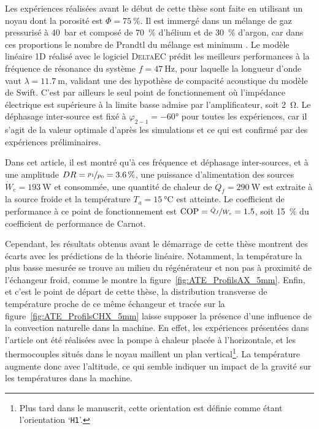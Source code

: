 Les expériences réalisées avant le début de cette thèse sont faite en utilisant un noyau dont la porosité est $\Phi=\qty{75}{\percent}$. Il est immergé dans un mélange de gaz pressurisé à \qty{40}{\bar} et composé de \qty{70}{\percent} d'hélium et de \qty{30}{\percent} d'argon, car dans ces proportions le nombre de Prandtl du mélange est minimum \cite{belcher_working_1999}. Le modèle linéaire 1D réalisé avec le logiciel \textsc{DeltaEC} prédit les meilleurs performances à la fréquence de résonance du système $f=\qty{47}{\hertz}$, pour laquelle la longueur d'onde vaut $\lambda=\qty{11.7}{\meter}$, validant une des hypothèse de compacité acoustique du modèle de Swift. C'est par ailleurs le seul point de fonctionnement où l'impédance électrique est supérieure à la limite basse admise par l'amplificateur, soit \qty{2}{\ohm}. Le déphasage inter-source est fixé à $\varphi_{2-1}=\ang{-60}$ pour toutes les expériences, car il s'agit de la valeur optimale d'après les simulations et ce qui est confirmé par des expériences préliminaires.

Dans cet article, il est montré qu'à ces fréquence et déphasage inter-sources, et à une amplitude $DR=\nicefrac{p_1}{p_0}=\qty{3.6}{\percent}$, une puissance d'alimentation des sources $\dot W_e=\qty{193}{\watt}$ et consommée, une quantité de chaleur de $\dot Q_f=\qty{290}{\watt}$ est extraite à la source froide et la température $T_a=\qty{15}{\degreeCelsius}$ est atteinte. Le coefficient de performance à ce point de fonctionnement est $\mathrm{COP}=\nicefrac{\dot Q_f}{\dot W_e}=\num{1.5}$, soit \qty{15}{\percent} du coefficient de performance de Carnot.\smallskip

Cependant, les résultats obtenus avant le démarrage de cette thèse montrent des écarts avec les prédictions de la théorie linéaire. Notamment, la température la plus basse mesurée se trouve au milieu du régénérateur et non pas à proximité de l'échangeur froid, comme le montre la figure~\ref{fig:ATE_ProfilsAX_5mm}. Enfin, et c'est le point de départ de cette thèse, la distribution transverse de température proche de ce même échangeur et tracée sur la figure~\ref{fig:ATE_ProfilsCHX_5mm}  laisse supposer la présence d'une influence de la convection naturelle dans la machine. En effet, les expériences présentées dans l'article ont été réalisées avec la pompe à chaleur placée à l'horizontale, et les thermocouples situés dans le noyau maillent un plan vertical\footnote{Plus tard dans le manuscrit, cette orientation est définie comme étant l'orientation `\texttt{H1}'.}. La température augmente donc avec l'altitude, ce qui semble indiquer un impact de la gravité sur les températures dans la machine.


